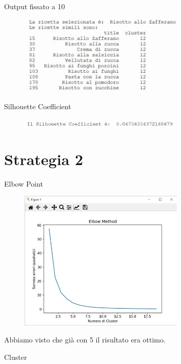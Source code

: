 \documentclass[12pt]{report}
\begin{document}
Output fissato a 10
\begin{figure}[H]
        \centering
        {\includegraphics[width=0.7\textwidth]{img/img24.jpg}}
\end{figure}

Silhouette Coefficient

\begin{figure}[H]
        \centering
        {\includegraphics[width=0.7\textwidth]{img/img28.jpg}}
\end{figure}

\section{Strategia 2}   

Elbow Point

\begin{figure}[H]
        \centering
        {\includegraphics[width=0.7\textwidth]{img/img25.jpg}}
\end{figure}

Abbiamo visto che già con 5 il risultato era ottimo.

Cluster
\end{document}
